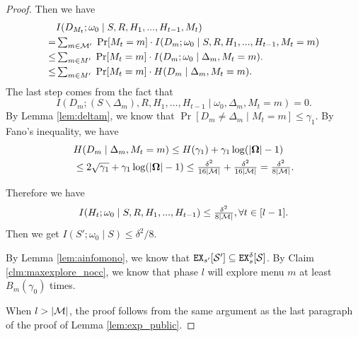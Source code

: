 \begin{proof}
Then we have
\begin{align*}
& I(D_{M_t}; \omega_0 \mid S,R,H_1,...,H_{t-1},M_t)\\
=& \textstyle   \sum_{m \in \mathcal{M}'}\; \Pr[M_t = m] \cdot I(D_m;\omega_0  \mid  S,R,H_1,...,H_{t-1},M_t = m)\\
\leq& \textstyle  \sum_{m \in M'}\; \Pr[M_t = m] \cdot I(D_m;\omega_0 \mid  \Delta_m, M_t =m).\\
\leq& \textstyle  \sum_{m \in M'}\; \Pr[M_t = m] \cdot H(D_m \mid  \Delta_m, M_t =m).
\end{align*}
The last step comes from the fact that
\[ I(D_m; (S\backslash \Delta_m),R,H_1,...,H_{t-1} \mid \omega_0, \Delta_m, M_t =m) = 0.\]
By Lemma \ref{lem:deltam}, we know that $\Pr[D_m \neq \Delta_m \mid M_t = m] \leq \gamma_1$. By Fano's inequality, we have
\begin{align*}
&H(D_m \mid  \Delta_m, M_t =m) \leq H(\gamma_1) + \gamma_1 \log(|\bold{\Omega}| - 1) \\
&\leq 2\sqrt{\gamma_1} + \gamma_1 \log(|\bold{\Omega}| - 1) \leq \tfrac{\delta^2}{16|\mathcal{M}|}+\tfrac{\delta^2}{16|\mathcal{M}|}  = \tfrac{\delta^2}{8|\mathcal{M}|}.
\end{align*}

Therefore we have
\[
I(H_t; \omega_0 \mid S,R,H_1,...,H_{t-1}) \leq \tfrac{\delta^2}{8|\mathcal{M}|}, \forall t \in [l-1].
\]
Then we get
    $ I(S'; \omega_0 \mid S) \leq \delta^2/8$.

By Lemma \ref{lem:ainfomono}, we know that $\mathtt{EX}_{s'}[\mathcal{S}'] \subseteq \mathtt{EX}^{\delta}_s[\mathcal{S}]$. By Claim \ref{clm:maxexplore_nocc}, we know that phase $l$ will explore menu $m$ at least $B_m(\gamma_0)$ times.

When $l > |\mathcal{M}|$, the proof follows from the same argument as the last paragraph of the proof of Lemma \ref{lem:exp_public}.
\end{proof}



